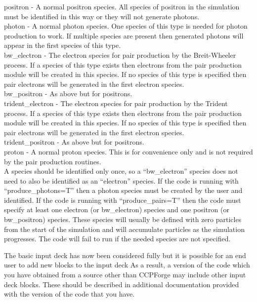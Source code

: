 {\emphtext positron} - A normal positron species. All species of positron in
  the simulation must be identified in this way or they will not generate
  photons.\\

{\emphtext photon} - A normal photon species. One species of this type is
  needed for photon production to work. If multiple species are present then
  generated photons will appear in the first species of this type.\\

{\emphtext bw\_electron} - The electron species for pair production by the
  Breit-Wheeler process. If a species of this type exists then electrons from
  the pair production module will be created in this species. If no species of
  this type is specified then pair electrons will be generated in the first
  electron species.\\

{\emphtext bw\_positron} - As above but for positrons.\\

{\emphtext trident\_electron} - The electron species for pair production by
  the Trident process. If a species of this type exists then electrons from
  the pair production module will be created in this species. If no species
  of this type is specified then pair electrons will be generated in the first
  electron species.\\

{\emphtext trident\_positron} - As above but for positrons.\\

{\emphtext proton} - A normal proton species. This is for convenience only and
  is not required by the pair production routines.\\

A species should be identified only once, so a ``bw\_electron'' species does
not need to also be identified as an ``electron'' species. If the code is
running with ``produce\_photons=T'' then a photon species must be created by
the user and identified. If the code is running with ``produce\_pairs=T'' then
the code must specify at least one electron (or bw\_electron) species and one
positron (or bw\_positron) species. These species will usually be defined with
zero particles from the start of the simulation and will accumulate particles
as the simulation progresses. The code will fail to run if the needed
species are not specified.

The basic input deck has now been considered fully but it
 is possible for an end user to add new blocks to the input deck As a result,
a version of the code which you have obtained from a source other than
CCPForge may include other input deck blocks. These should be described in
additional documentation provided with the version of the code that you have.

